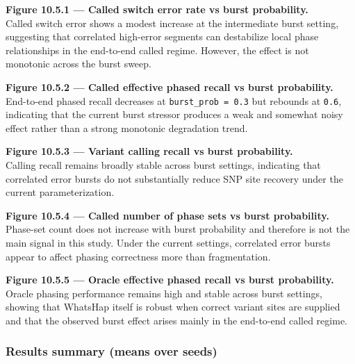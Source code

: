 \documentclass[
]{article}
\begin{document}
\textbf{Figure 10.5.1 --- Called switch error rate vs burst
probability.}\\
Called switch error shows a modest increase at the intermediate burst
setting, suggesting that correlated high-error segments can destabilize
local phase relationships in the end-to-end called regime. However, the
effect is not monotonic across the burst sweep.

\textbf{Figure 10.5.2 --- Called effective phased recall vs burst
probability.}\\
End-to-end phased recall decreases at \texttt{burst\_prob\ =\ 0.3} but
rebounds at \texttt{0.6}, indicating that the current burst stressor
produces a weak and somewhat noisy effect rather than a strong monotonic
degradation trend.

\textbf{Figure 10.5.3 --- Variant calling recall vs burst
probability.}\\
Calling recall remains broadly stable across burst settings, indicating
that correlated error bursts do not substantially reduce SNP site
recovery under the current parameterization.

\textbf{Figure 10.5.4 --- Called number of phase sets vs burst
probability.}\\
Phase-set count does not increase with burst probability and therefore
is not the main signal in this study. Under the current settings,
correlated error bursts appear to affect phasing correctness more than
fragmentation.

\textbf{Figure 10.5.5 --- Oracle effective phased recall vs burst
probability.}\\
Oracle phasing performance remains high and stable across burst
settings, showing that WhatsHap itself is robust when correct variant
sites are supplied and that the observed burst effect arises mainly in
the end-to-end called regime.

\subsubsection{Results summary (means over
seeds)}\label{results-summary-means-over-seeds-3}
\end{document}
